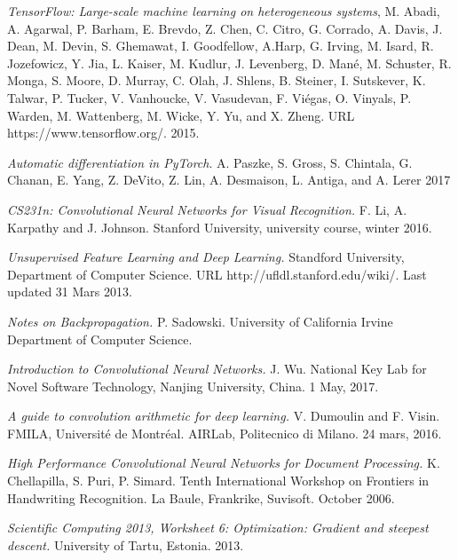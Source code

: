 \documentclass[a4paper,11pt,twoside]{article}
\begin{document}
\begin{thebibliography}{99}	
\textit{TensorFlow: Large-scale machine learning on heterogeneous systems},
M. Abadi, A. Agarwal, P. Barham, E. Brevdo,
Z. Chen, C. Citro, G. Corrado, A. Davis,
J. Dean, M. Devin, S. Ghemawat, I. Goodfellow,
A.Harp, G. Irving, M. Isard, R. Jozefowicz, Y. Jia,
L. Kaiser, M. Kudlur, J. Levenberg, D. Mané, M. Schuster,
R. Monga, S. Moore, D. Murray, C. Olah, J. Shlens,
B. Steiner, I. Sutskever, K. Talwar, P. Tucker,
V. Vanhoucke, V. Vasudevan, F. Viégas,
O. Vinyals, P. Warden, M. Wattenberg, M. Wicke,
Y. Yu, and X. Zheng.
URL https://www.tensorflow.org/.
2015.

\textit{Automatic differentiation in PyTorch}.
A. Paszke,   S. Gross, S. Chintala,   G. Chanan,   E. Yang,   Z. DeVito,   Z. Lin,   A. Desmaison,   L. Antiga,  and A. Lerer
2017

	\textit{CS231n: Convolutional Neural Networks for Visual Recognition.}
    F. Li, A. Karpathy and J. Johnson.
	Stanford University, university course, winter 2016.
	
	\textit{Unsupervised Feature Learning and Deep Learning.}
    Standford University, Department of Computer Science.
    URL http://ufldl.stanford.edu/wiki/.
	Last updated 31 Mars 2013.	
	
	\textit{Notes on Backpropagation.}
    P. Sadowski.
    University of California Irvine	Department of Computer Science.
    
	\textit{Introduction to Convolutional Neural Networks.}
    J. Wu. 
    National Key Lab for Novel Software Technology, Nanjing University, China.
    1 May, 2017.

	\textit{A guide to convolution arithmetic for deep learning.}
    V. Dumoulin  and F. Visin.
    FMILA, Université de Montréal. AIRLab, Politecnico di Milano.
	24 mars, 2016.

	\textit{High Performance Convolutional Neural Networks for Document Processing.}
    K. Chellapilla, S. Puri, P. Simard.
    Tenth International Workshop on Frontiers in Handwriting Recognition. 
    La Baule, Frankrike, Suvisoft.
	October 2006.


	
	\textit{Scientific Computing 2013, Worksheet 6: Optimization: Gradient and steepest descent.}
    University of Tartu, Estonia.
    2013.
    

\end{thebibliography}
\end{document}
